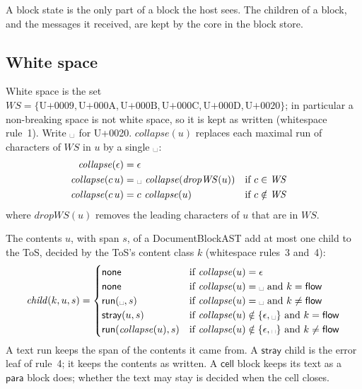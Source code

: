 \documentclass[11pt]{article}
\numberwithin{equation}{section}
\newcommand{\kw}[1]{\ensuremath{\mathsf{#1}}}
\newcommand{\vs}{\text{\textvisiblespace}}
\begin{document}
A block state is the only part of a block the host sees.  The children of
a block, and the messages it received, are kept by the core in the block
store.

\subsection{White space}
\label{sec:white-space}

White space is the set
$\mathit{WS} = \{\text{U+0009}, \text{U+000A}, \text{U+000B},
\text{U+000C}, \text{U+000D}, \text{U+0020}\}$; in particular a
non-breaking space is not white space, so it is kept as written
(whitespace rule~1).  Write $\vs$ for U+0020.
$\mathit{collapse}(u)$ replaces each maximal run of characters of
$\mathit{WS}$ in $u$ by a single $\vs$:
\begin{equation}\label{eq:collapse}
\begin{aligned}
\mathit{collapse}(\epsilon) &= \epsilon \\
\mathit{collapse}(c\,u) &=
  \vs\ \mathit{collapse}(\mathit{dropWS}(u))
  && \text{if } c \in \mathit{WS} \\
\mathit{collapse}(c\,u) &= c\ \mathit{collapse}(u)
  && \text{if } c \notin \mathit{WS}
\end{aligned}
\end{equation}
where $\mathit{dropWS}(u)$ removes the leading characters of $u$ that are in
$\mathit{WS}$.

The contents $u$, with span $s$, of a DocumentBlockAST add at most one
child to the ToS, decided by the ToS's content class $k$
(whitespace rules~3 and~4):
\begin{equation}\label{eq:text-child}
\mathit{child}(k, u, s) =
\begin{cases}
\kw{none} & \text{if } \mathit{collapse}(u) = \epsilon \\
\kw{none} & \text{if } \mathit{collapse}(u) = \vs
  \text{ and } k = \kw{flow} \\
\kw{run}(\vs, s) & \text{if } \mathit{collapse}(u) =
  \vs \text{ and } k \neq \kw{flow} \\
\kw{stray}(u, s) & \text{if } \mathit{collapse}(u) \notin
  \{\epsilon, \vs\} \text{ and } k = \kw{flow} \\
\kw{run}(\mathit{collapse}(u), s) & \text{if } \mathit{collapse}(u)
  \notin \{\epsilon, \vs\} \text{ and } k \neq \kw{flow}
\end{cases}
\end{equation}
A text run keeps the span of the contents it came from.  A $\kw{stray}$
child is the error leaf of rule~4; it keeps the contents as written.  A
$\kw{cell}$ block keeps its text as a $\kw{para}$ block does; whether the
text may stay is decided when the cell closes.
\end{document}
